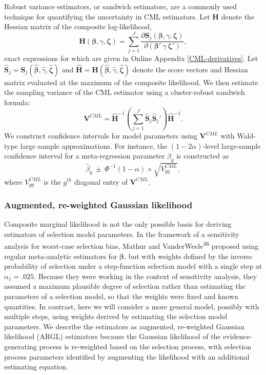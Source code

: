 \documentclass[
  man, donotrepeattitle,floatsintext]{apa7}
\begin{document}
Robust variance estimators, or sandwich estimators, are a commonly used technique for quantifying the uncertainty in CML estimators. Let \(\mathbf{H}\) denote the Hessian matrix of the composite log-likelihood,
\begin{equation}
\mathbf{H}(\boldsymbol\beta, \gamma, \boldsymbol\zeta) = \sum_{j=1}^J \frac{\partial \mathbf{S}_j(\boldsymbol\beta, \gamma, \boldsymbol\zeta)}{\partial \left(\boldsymbol\beta' \ \gamma \ \boldsymbol\zeta'\right)},
\end{equation}
exact expressions for which are given in Online Appendix \ref{CML-derivatives}.
Let \(\mathbf{\hat{S}}_j = \mathbf{S}_j(\boldsymbol{\hat\beta}, \hat\gamma, \boldsymbol{\hat\zeta})\) and \(\mathbf{\hat{H}} = \mathbf{H}(\boldsymbol{\hat\beta}, \hat\gamma, \boldsymbol{\hat\zeta})\) denote the score vectors and Hessian matrix evaluated at the maximum of the composite likelihood.
We then estimate the sampling variance of the CML estimator using a cluster-robust sandwich formula:
\begin{equation}
\label{eq:sandwich-variance}
\mathbf{V}^{CML} = \mathbf{\hat{H}}^{-1}\left(\sum_{j=1}^J \mathbf{\hat{S}}_j {\mathbf{\hat{S}}_j}'\right) \mathbf{\hat{H}}^{-1}.
\end{equation}
We construct confidence intervals for model parameters using \(\mathbf{V}^{CML}\) with Wald-type large sample approximations. For instance, the \((1 - 2\alpha)\)-level large-sample confidence interval for a meta-regression parameter \(\beta_g\) is constructed as
\[
\hat\beta_g \ \pm \ \Phi^{-1}(1 - \alpha) \times \sqrt{V^{CML}_{gg}},
\]
where \(V^{CML}_{gg}\) is the \(g^{th}\) diagonal entry of \(\mathbf{V}^{CML}\).

\subsubsection{Augmented, re-weighted Gaussian likelihood}\label{augmented-re-weighted-gaussian-likelihood}

Composite marginal likelihood is not the only possible basis for deriving estimators of selection model parameters.
In the framework of a sensitivity analysis for worst-case selection bias, Mathur and VanderWeele\textsuperscript{46} proposed using regular meta-analytic estimators for \(\boldsymbol\beta\), but with weights defined by the inverse probability of selection under a step-function selection model with a single step at \(\alpha_1 = .025\).
Because they were working in the context of sensitivity analysis, they assumed a maximum plausible degree of selection rather than estimating the parameters of a selection model, so that the weights were fixed and known quantities.
In contrast, here we will consider a more general model, possibly with multiple steps, using weights derived by estimating the selection model parameters.
We describe the estimators as augmented, re-weighted Gaussian likelihood (ARGL) estimators because the Gaussian likelihood of the evidence-generating process is re-weighted based on the selection process, with selection process parameters identified by augmenting the likelihood with an additional estimating equation.
\end{document}
